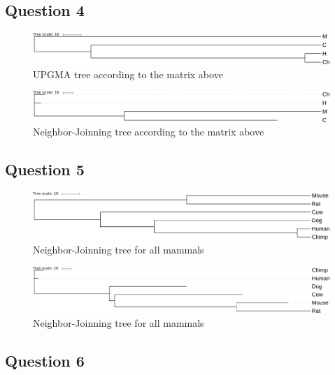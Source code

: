 \documentclass[]{article}
\begin{document}
\subsection{Question 4}

\begin{figure}[h!]
	\includegraphics*[width = \linewidth]{../UPGMA1.pdf}
	\caption{\label{upgma1} UPGMA tree according to the matrix above }
\end{figure}

\begin{figure}[h!]
	\includegraphics*[width = \linewidth]{../NJ1.pdf}
	\caption{\label{nj1} Neighbor-Joinning tree according to the matrix above }
\end{figure}

\subsection{Question 5}


\begin{figure}[h!]
	\includegraphics*[width = \linewidth]{../files/UPGMA.pdf}
	\caption{\label{upgma2} Neighbor-Joinning tree for all mammals }
\end{figure}

\begin{figure}[h!]
	\includegraphics*[width = \linewidth]{../files/NJ.pdf}
	\caption{\label{nj2} Neighbor-Joinning tree for all mammals }
\end{figure}

\subsection{Question 6}
\end{document}
